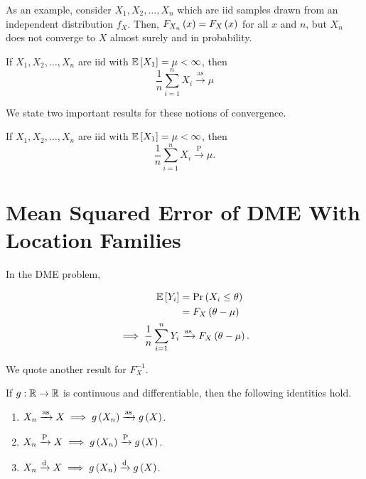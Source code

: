 \documentclass[twoside]{article}
\begin{document}
As an example, consider \(X_1,X_2,\ldots,X_n\) which are iid samples drawn from
an independent distribution \(f_X\). Then, \(F_{X_n}\left(x\right) = F_X\left(x\right)\) 
for all \(x\) and \(n\), but \(X_n\) does not converge to \(X\) almost surely and
in probability.

\begin{theorem}
    If \(X_1,X_2,\ldots,X_n\) are iid with \(\mathbb{E}\left[ X_1 \right] = \mu < \infty\), then
    \begin{equation}
        \frac{1}{n}\sum_{i=1}^nX_i \xrightarrow{\mathrm{as}} \mu
        \label{eq:slln-cond}
    \end{equation}
\end{theorem}

We state two important results for these notions of convergence.

\begin{theorem}
    If \(X_1,X_2,\ldots,X_n\) are iid with \(\mathbb{E}\left[ X_1 \right] = \mu < \infty\), then
    \begin{equation}
        \frac{1}{n}\sum_{i=1}^nX_i \xrightarrow{\mathrm{P}} \mu.
        \label{eq:wlln-cond}
    \end{equation}
\end{theorem}

\section{Mean Squared Error of DME With Location Families}

In the DME problem,

\begin{align}
    \mathbb{E}\left[ Y_i \right] &= \Pr\left(X_i\le\theta\right) \\
               &= F_X\left(\theta-\mu\right) \\
    \implies \frac{1}{n}\sum_{i=1}^nY_i &\xrightarrow{\mathrm{as}} F_X\left(\theta-\mu\right).
    \label{eq:slln-dme}
\end{align}

We quote another result for \(F_X^{-1}\).

\begin{theorem}
    \label{thm:cmt}
    If \(g:\mathbb R\rightarrow\mathbb R\) is continuous and differentiable, then the
    following identities hold.
    \begin{enumerate}
        \item \(X_n\xrightarrow{\mathrm{as}}X \implies g\left(X_n\right)\xrightarrow{\mathrm{as}}g\left(X\right)\).
        \item \(X_n\xrightarrow{\mathrm{P}}X \implies g\left(X_n\right)\xrightarrow{\mathrm{P}}g\left(X\right)\).
        \item \(X_n\xrightarrow{\mathrm{d}}X \implies g\left(X_n\right)\xrightarrow{\mathrm{d}}g\left(X\right)\).
    \end{enumerate}
\end{theorem}
\end{document}
